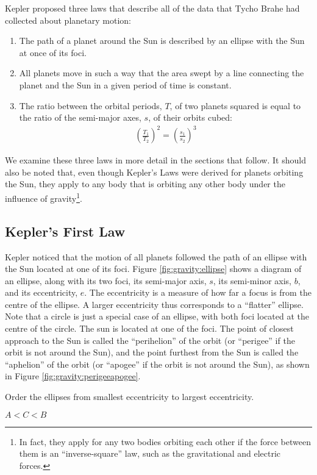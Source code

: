 Kepler proposed three laws that describe all of the data that Tycho Brahe had collected about planetary motion:
\begin{enumerate}
\item The path of a planet around the Sun is described by an ellipse with the Sun at once of its foci.
\item All planets move in such a way that the area swept by a line connecting the planet and the Sun in a given period of time is constant.
\item The ratio between the orbital periods, $T$, of two planets squared is equal to the ratio of the semi-major axes, $s$, of their orbits cubed:
\begin{align*}
\left(\frac{T_1}{T_2}\right)^2=\left(\frac{s_1}{s_2}\right)^3
\end{align*}
\end{enumerate}
We examine these three laws in more detail in the sections that follow. It should also be noted that, even though Kepler's Laws were derived for planets orbiting the Sun, they apply to any body that is orbiting any other body under the influence of gravity\footnote{In fact, they apply for any two bodies orbiting each other if the force between them is an ``inverse-square'' law, such as the gravitational and electric forces.}.

\subsection{Kepler's First Law}
Kepler noticed that the motion of all planets followed the path of an ellipse with the Sun located at one of its foci. Figure \ref{fig:gravity:ellipse} shows a diagram of an ellipse, along with its two foci, its semi-major axis, $s$, its semi-minor axis, $b$, and its eccentricity, $e$. The eccentricity is a measure of how far a focus is from the centre of the ellipse. A larger eccentricity thus corresponds to a ``flatter'' ellipse. Note that a circle is just a special case of an ellipse, with both foci located at the centre of the circle.
The sun is located at one of the foci. The point of closest approach to the Sun is called the ``perihelion'' of the orbit (or ``perigee'' if the orbit is not around the Sun), and the point furthest from the Sun is called the ``aphelion'' of the orbit (or ``apogee'' if the orbit is not around the Sun), as shown in Figure \ref{fig:gravity:perigeeapogee}.
\begin{checkpoint} Order the ellipses from smallest eccentricity to largest eccentricity.
\begin{answer}
$A<C<B$
\end{answer}
\end{checkpoint}
